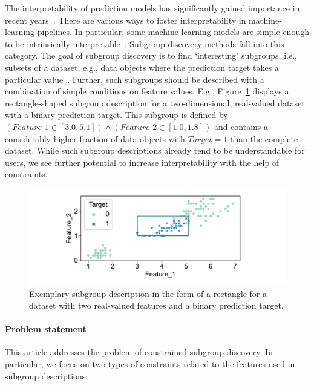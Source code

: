 \documentclass{article}
\theoremstyle{definition}
\begin{document}
The interpretability of prediction models has significantly gained importance in recent years~\cite{carvalho2019machine, molnar2020interpretable}.
There are various ways to foster interpretability in machine-learning pipelines.
In particular, some machine-learning models are simple enough to be intrinsically interpretable~\cite{carvalho2019machine}.
Subgroup-discovery methods fall into this category.
The goal of subgroup discovery is to find `interesting' subgroups, i.e., subsets of a dataset, e.g., data objects where the prediction target takes a particular value~\cite{atzmueller2015subgroup}.
Further, such subgroups should be described with a combination of simple conditions on feature values.
E.g., Figure~\ref{fig:csd:exemplary-subgroup} displays a rectangle-shaped subgroup description for a two-dimensional, real-valued dataset with a binary prediction target.
This subgroup is defined by $(\mathit{Feature\_1} \in [3.0, 5.1]) \land (\mathit{Feature\_2} \in [1.0, 1.8])$ and contains a considerably higher fraction of data objects with $\mathit{Target} = 1$ than the complete dataset.
While such subgroup descriptions already tend to be understandable for users, we see further potential to increase interpretability with the help of constraints.

\begin{figure}[t]
	\centering
	\includegraphics[width=\textwidth, trim=15 15 15 15, clip]{plots/csd-exemplary-subgroup.pdf}
	\caption{
		Exemplary subgroup description in the form of a rectangle for a dataset with two real-valued features and a binary prediction target.
	}
	\label{fig:csd:exemplary-subgroup}
\end{figure}

\paragraph{Problem statement}

This article addresses the problem of constrained subgroup discovery.
In particular, we focus on two types of constraints related to the features used in subgroup descriptions:
\end{document}
